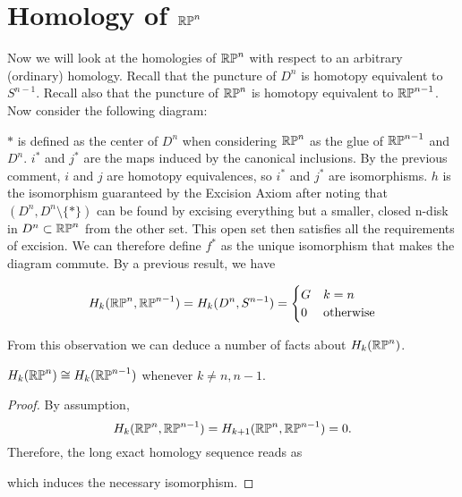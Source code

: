 \section{Homology of $\mathbb{RP}^{n}$}
Now we will look at the homologies of $\mathbb{RP}^{n}$ with respect to an arbitrary (ordinary) homology. Recall that the puncture of $D^n$ is homotopy equivalent to $S^{n-1}$. Recall also that the puncture of $\mathbb{RP}^{n}$ is homotopy equivalent to $\mathbb{RP}^{n-1}$. Now consider the following diagram:


$*$ is defined as the center of $D^n$ when considering $\mathbb{RP}^{n}$ as the glue of $\mathbb{RP}^{n-1}$ and $D^n$. $i^*$ and $j^*$ are the maps induced by the canonical inclusions. By the previous comment, $i$ and $j$ are homotopy equivalences, so $i^*$ and $j^*$ are isomorphisms. $h$ is the isomorphism guaranteed by the Excision Axiom after noting that $(D^n,D^n\setminus \{*\})$ can be found by excising everything but a smaller, closed n-disk in $D^n\subset \mathbb{RP}^{n}$ from the other set. This open set then satisfies all the requirements of excision. We can therefore define $f^*$ as the unique isomorphism that makes the diagram commute. By a previous result, we have 

\[H_k(\mathbb{RP}^{n},\mathbb{RP}^{n-1})=H_k(D^n,S^{n-1})=
\begin{cases} 
      G & k=n \\
      0 & \text{otherwise}
   \end{cases}
\]

From this observation we can deduce a number of facts about $H_k(\mathbb{RP}^{n})$.

\begin{lemma}
\label{projective-space-iso}
$H_k(\mathbb{RP}^{n})\cong H_k(\mathbb{RP}^{n-1})$ whenever $k\neq n,n-1$.
\end{lemma}
\begin{proof}
By assumption, $$H_k(\mathbb{RP}^{n},\mathbb{RP}^{n-1})=H_{k+1}(\mathbb{RP}^{n},\mathbb{RP}^{n-1})=0.$$
Therefore, the long exact homology sequence reads as


which induces the necessary isomorphism.
\end{proof}

